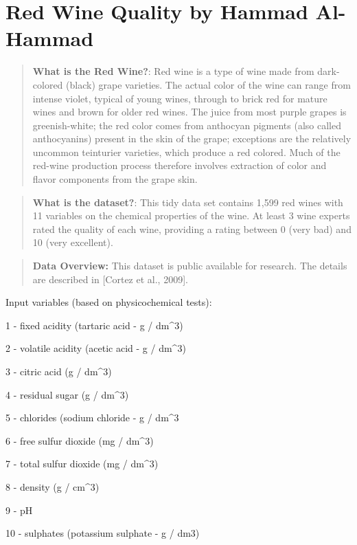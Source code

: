 \documentclass[]{article}
\title{}
\author{}
\date{}
\begin{document}
\section{Red Wine Quality by Hammad
Al-Hammad}\label{red-wine-quality-by-hammad-al-hammad}

\begin{quote}
\textbf{What is the Red Wine?}: Red wine is a type of wine made from
dark-colored (black) grape varieties. The actual color of the wine can
range from intense violet, typical of young wines, through to brick red
for mature wines and brown for older red wines. The juice from most
purple grapes is greenish-white; the red color comes from anthocyan
pigments (also called anthocyanins) present in the skin of the grape;
exceptions are the relatively uncommon teinturier varieties, which
produce a red colored. Much of the red-wine production process therefore
involves extraction of color and flavor components from the grape skin.
\end{quote}

\begin{quote}
\textbf{What is the dataset?}: This tidy data set contains 1,599 red
wines with 11 variables on the chemical properties of the wine. At least
3 wine experts rated the quality of each wine, providing a rating
between 0 (very bad) and 10 (very excellent).
\end{quote}

\begin{quote}
\textbf{Data Overview:} This dataset is public available for research.
The details are described in {[}Cortez et al., 2009{]}.
\end{quote}

Input variables (based on physicochemical tests):

1 - fixed acidity (tartaric acid - g / dm\^{}3)

2 - volatile acidity (acetic acid - g / dm\^{}3)

3 - citric acid (g / dm\^{}3)

4 - residual sugar (g / dm\^{}3)

5 - chlorides (sodium chloride - g / dm\^{}3

6 - free sulfur dioxide (mg / dm\^{}3)

7 - total sulfur dioxide (mg / dm\^{}3)

8 - density (g / cm\^{}3)

9 - pH

10 - sulphates (potassium sulphate - g / dm3)
\end{document}
